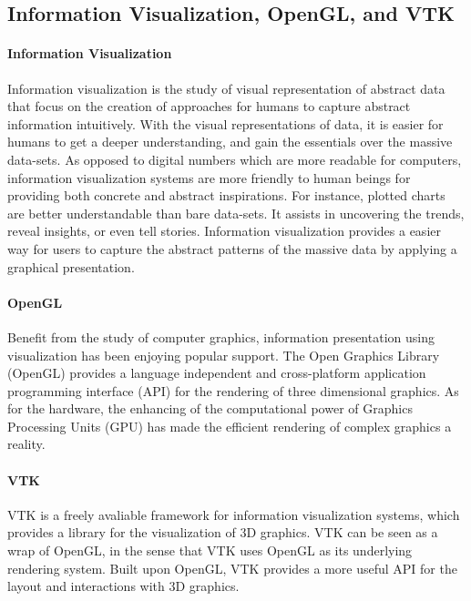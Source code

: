 \documentclass[runningheads]{llncs}
\newcommand\tool[1]{\textsf{#1}}
\begin{document}
{\color{blue}
\subsection{Information Visualization, \tool{OpenGL}, and \tool{VTK}}
\paragraph{Information Visualization}
Information visualization is the study of visual representation of abstract data that focus on the creation of approaches for humans to capture abstract information intuitively. With the visual representations of data, it is easier for humans to get a deeper understanding, and gain the essentials over the massive data-sets.
As opposed to digital numbers which are more readable for computers, information visualization systems are more friendly to human beings for providing both concrete and abstract inspirations. For instance, plotted charts are better understandable than bare data-sets. It assists in uncovering the trends, reveal insights, or even tell stories. Information visualization provides a easier way for users to capture the abstract patterns of the massive data by applying a graphical presentation.
 
\paragraph{\tool{OpenGL}}
Benefit from the study of computer graphics, information presentation using visualization has been enjoying popular support.  The Open Graphics Library (\textsf{OpenGL}) provides a language independent and cross-platform application programming interface (\textsf{API}) for the rendering of three dimensional graphics. As for the hardware, the enhancing of the computational power of Graphics Processing Units (\textsf{GPU}) has made the efficient rendering of complex graphics a reality. 


\paragraph{\tool{VTK}}
\tool{VTK} is a freely avaliable framework for information visualization systems, which provides a library for the visualization of 3D graphics. \tool{VTK} can be seen as a wrap of \tool{OpenGL}, in the sense that \tool{VTK} uses \tool{OpenGL} as its underlying rendering system. Built upon \tool{OpenGL}, \tool{VTK} provides a more useful \tool{API} for the layout and interactions with 3D graphics.

}
\end{document}
